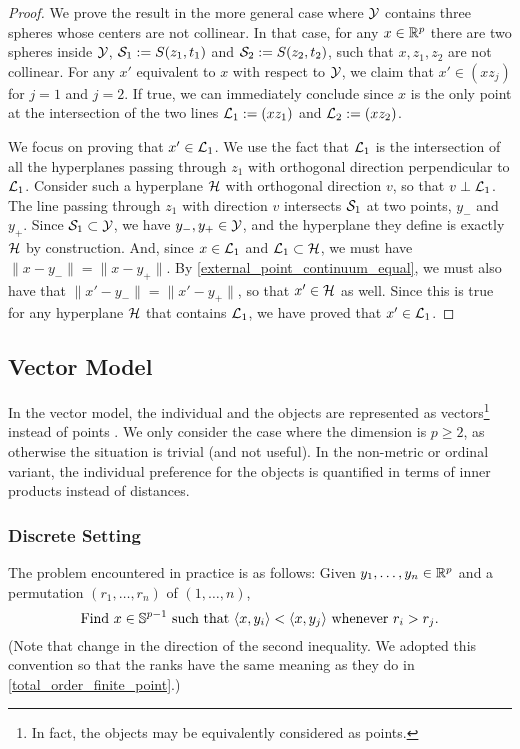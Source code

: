 \documentclass[twoside, 11pt]{article}
\begin{document}
\begin{proof}
We prove the result in the more general case where $\mathcal{Y}$ contains three spheres whose centers are not collinear.
In that case, for any $x \in \mathbb{R}^p$ there are two spheres inside $\mathcal{Y}$, $\mathcal{S}_1 := S(z_1, t_1)$ and $\mathcal{S}_2 := S(z_2, t_2)$, such that $x, z_1, z_2$ are not collinear. 
For any $x'$ equivalent to $x$ with respect to $\mathcal{Y}$, we claim that $x' \in (xz_j)$ for $j = 1$ and $j = 2$. If true, we can immediately conclude since $x$ is the only point at the intersection of the two lines $\mathcal{L}_1 := (xz_1)$ and $\mathcal{L}_2 := (xz_2)$. 

We focus on proving that $x' \in \mathcal{L}_1$. 
We use the fact that $\mathcal{L}_1$ is the intersection of all the hyperplanes passing through $z_1$ with orthogonal direction perpendicular to $\mathcal{L}_1$. Consider such a hyperplane $\mathcal{H}$ with orthogonal direction $v$, so that $v \perp \mathcal{L}_1$. The line passing through $z_1$ with direction $v$ intersects $\mathcal{S}_1$ at two points, $y_-$ and $y_+$. 
Since $\mathcal{S}_1 \subset \mathcal{Y}$, we have $y_-, y_+ \in \mathcal{Y}$, and the hyperplane they define is exactly $\mathcal{H}$ by construction.
And, since $x\in \mathcal{L}_1$ and $\mathcal{L}_1 \subset \mathcal{H}$, we must have $\|x-y_-\| = \|x-y_+\|$. 
By \eqref{external_point_continuum_equal}, we must also have that $\|x'-y_-\| = \|x'-y_+\|$, so that $x' \in \mathcal{H}$ as well.
Since this is true for any hyperplane $\mathcal{H}$ that contains $\mathcal{L}_1$, we have proved that $x' \in \mathcal{L}_1$.
\end{proof}



\subsection{Vector Model}
In the vector model, the individual and the objects are represented as vectors\footnote{In fact, the objects may be equivalently considered as points.} instead of points \cite[Sec 16.2]{borg2005modern}. We only consider the case where the dimension is $p \ge 2$, as otherwise the situation is trivial (and not useful).
In the non-metric or ordinal variant, the individual preference for the objects is quantified in terms of inner products instead of distances. 

\subsubsection{Discrete Setting}
\label{sec:external vector discrete}
The problem encountered in practice is as follows: Given $y_1, \dots, y_n \in \mathbb{R}^p$ and a permutation $(r_1, \dots, r_n)$ of $(1, \dots, n)$,
\begin{equation}
\label{total_order_finite_vector}
\text{Find $x \in \mathbb{S}^{p-1}$ such that $\langle x, y_i\rangle < \langle x, y_j\rangle$ whenever $r_i > r_j$.}
\end{equation}
(Note that change in the direction of the second inequality. We adopted this convention so that the ranks have the same meaning as they do in \eqref{total_order_finite_point}.)
\end{document}
